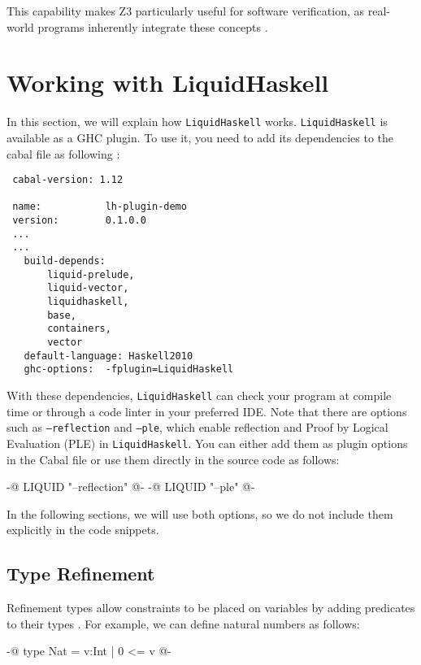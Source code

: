 \documentclass[]{rptuseminar}
\begin{document}
This capability makes Z3 particularly useful for software verification, as real-world programs inherently integrate these concepts \cite{nikolaj_bjorner_programming_nodate}.
\section{Working with \textbf{LiquidHaskell}}
\label{sec:lh}
In this section, we will explain how \texttt{LiquidHaskell} works.
\texttt{LiquidHaskell} is available as a GHC plugin. To use it, you need to add its dependencies to the cabal file as following \cite{noauthor_ucsd-progsyslh-plugin-demo_2024}:

\vspace{1em}
\begin{lstlisting}
 cabal-version: 1.12

 name:           lh-plugin-demo
 version:        0.1.0.0
 ...
 ...
   build-depends:
       liquid-prelude,
       liquid-vector,
       liquidhaskell,
       base,
       containers,
       vector
   default-language: Haskell2010
   ghc-options:  -fplugin=LiquidHaskell
\end{lstlisting}
\vspace{1em}

With these dependencies, \texttt{LiquidHaskell} can check your program at compile time or through a code linter in your preferred IDE.  
Note that there are options such as \texttt{---reflection} and \texttt{---ple}, which enable reflection and Proof by Logical Evaluation (PLE) in \texttt{LiquidHaskell}.  
You can either add them as plugin options in the Cabal file or use them directly in the source code as follows:  

\begin{haskell}  
{-@ LIQUID "--reflection" @-}  
{-@ LIQUID "--ple" @-}  
\end{haskell}  

In the following sections, we will use both options, so we do not include them explicitly in the code snippets. 

\subsection{Type Refinement}
Refinement types allow constraints to be placed on variables by adding predicates to their types
\cite{jhala_programming_2020}. For example, we can define natural numbers as follows:

\begin{haskell}
 {-@ type Nat = {v:Int | 0 <= v} @-}
\end{haskell}
\end{document}
